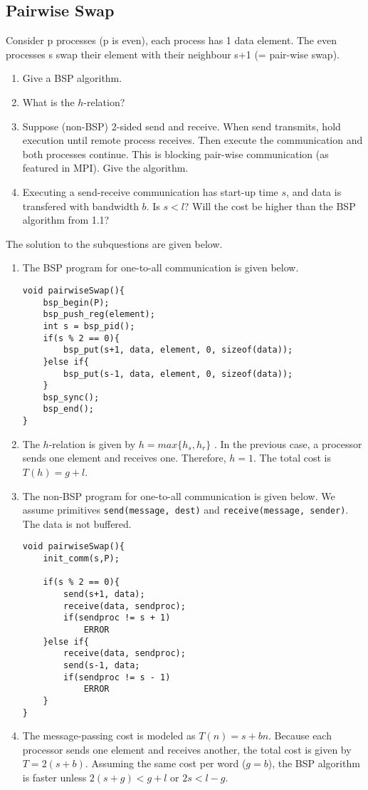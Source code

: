 \documentclass[../main.tex]{subfiles}
\begin{document}
\subsection{Pairwise Swap}
\begin{question}
Consider p processes (p is even), each process has 1 data element. The even processes s swap their element with their neighbour s+1 (= pair-wise swap).
\begin{enumerate}
	\item Give a BSP algorithm.
	\item What is the $h$-relation?
	\item Suppose (non-BSP) 2-sided send and receive. When send transmits, hold execution until remote process receives. Then execute the communication and both processes continue. This is blocking pair-wise communication (as featured in MPI). Give the algorithm.
	\item Executing a send-receive communication has start-up time $s$, and data is transfered with bandwidth $b$. Is $s < l$? Will the cost be higher than the BSP algorithm from 1.1?
\end{enumerate}
\end{question}
\begin{solution} The solution to the subquestions are given below.
\begin{enumerate}
	\item The BSP program for one-to-all communication is given below.
\begin{lstlisting}
void pairwiseSwap(){
	bsp_begin(P);
	bsp_push_reg(element);
	int s = bsp_pid();
	if(s % 2 == 0){
		bsp_put(s+1, data, element, 0, sizeof(data));
	}else if{
		bsp_put(s-1, data, element, 0, sizeof(data));
	}
	bsp_sync();
	bsp_end();
}
\end{lstlisting}
	\item The $h$-relation is given by $h = max\{h_s,h_r\}$ \cite[p.~5]{bisseling04}. In the previous case, a processor sends one element and receives one. Therefore, $h = 1$. The total cost is $T(h) = g + l$.
	\item The non-BSP program for one-to-all communication is given below. We assume primitives \texttt{send(message, dest)} and \texttt{receive(message, sender)}. The data is not buffered.
\begin{lstlisting}
void pairwiseSwap(){
	init_comm(s,P);

	if(s % 2 == 0){
		send(s+1, data);
		receive(data, sendproc);
		if(sendproc != s + 1)
			ERROR
	}else if{
		receive(data, sendproc);
		send(s-1, data;
		if(sendproc != s - 1)
			ERROR
	}
}
\end{lstlisting}
\item The message-passing cost is modeled as $T(n) = s + bn$. Because each processor sends one element and receives another, the total cost is given by $T = 2(s+b)$. Assuming the same cost per word ($g=b$), the BSP algorithm is faster unless $2(s+g) < g + l$ or $2s < l - g$.
\end{enumerate}
\end{solution}
\end{document}
